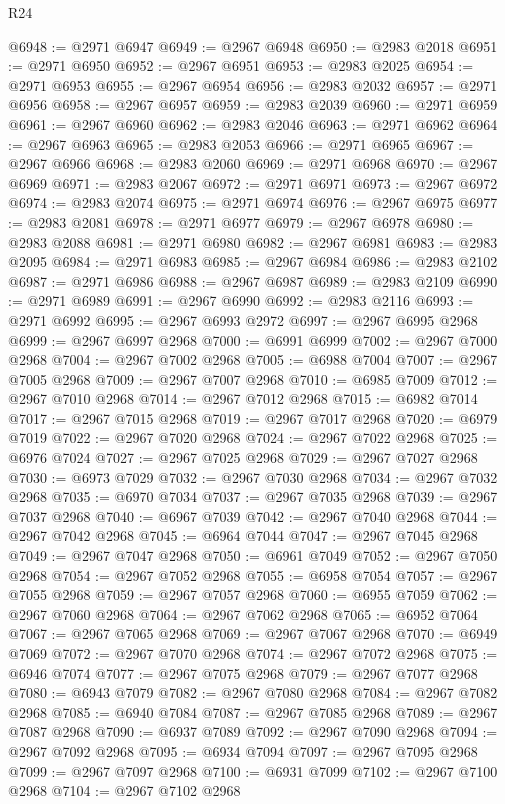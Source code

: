 \begin{lexlean}{R24}
\begin{coremodule}
@6948 := @2971 @6947
@6949 := @2967 @6948
@6950 := @2983 @2018
@6951 := @2971 @6950
@6952 := @2967 @6951
@6953 := @2983 @2025
@6954 := @2971 @6953
@6955 := @2967 @6954
@6956 := @2983 @2032
@6957 := @2971 @6956
@6958 := @2967 @6957
@6959 := @2983 @2039
@6960 := @2971 @6959
@6961 := @2967 @6960
@6962 := @2983 @2046
@6963 := @2971 @6962
@6964 := @2967 @6963
@6965 := @2983 @2053
@6966 := @2971 @6965
@6967 := @2967 @6966
@6968 := @2983 @2060
@6969 := @2971 @6968
@6970 := @2967 @6969
@6971 := @2983 @2067
@6972 := @2971 @6971
@6973 := @2967 @6972
@6974 := @2983 @2074
@6975 := @2971 @6974
@6976 := @2967 @6975
@6977 := @2983 @2081
@6978 := @2971 @6977
@6979 := @2967 @6978
@6980 := @2983 @2088
@6981 := @2971 @6980
@6982 := @2967 @6981
@6983 := @2983 @2095
@6984 := @2971 @6983
@6985 := @2967 @6984
@6986 := @2983 @2102
@6987 := @2971 @6986
@6988 := @2967 @6987
@6989 := @2983 @2109
@6990 := @2971 @6989
@6991 := @2967 @6990
@6992 := @2983 @2116
@6993 := @2971 @6992
@6995 := @2967 @6993 @2972
@6997 := @2967 @6995 @2968
@6999 := @2967 @6997 @2968
@7000 := @6991 @6999
@7002 := @2967 @7000 @2968
@7004 := @2967 @7002 @2968
@7005 := @6988 @7004
@7007 := @2967 @7005 @2968
@7009 := @2967 @7007 @2968
@7010 := @6985 @7009
@7012 := @2967 @7010 @2968
@7014 := @2967 @7012 @2968
@7015 := @6982 @7014
@7017 := @2967 @7015 @2968
@7019 := @2967 @7017 @2968
@7020 := @6979 @7019
@7022 := @2967 @7020 @2968
@7024 := @2967 @7022 @2968
@7025 := @6976 @7024
@7027 := @2967 @7025 @2968
@7029 := @2967 @7027 @2968
@7030 := @6973 @7029
@7032 := @2967 @7030 @2968
@7034 := @2967 @7032 @2968
@7035 := @6970 @7034
@7037 := @2967 @7035 @2968
@7039 := @2967 @7037 @2968
@7040 := @6967 @7039
@7042 := @2967 @7040 @2968
@7044 := @2967 @7042 @2968
@7045 := @6964 @7044
@7047 := @2967 @7045 @2968
@7049 := @2967 @7047 @2968
@7050 := @6961 @7049
@7052 := @2967 @7050 @2968
@7054 := @2967 @7052 @2968
@7055 := @6958 @7054
@7057 := @2967 @7055 @2968
@7059 := @2967 @7057 @2968
@7060 := @6955 @7059
@7062 := @2967 @7060 @2968
@7064 := @2967 @7062 @2968
@7065 := @6952 @7064
@7067 := @2967 @7065 @2968
@7069 := @2967 @7067 @2968
@7070 := @6949 @7069
@7072 := @2967 @7070 @2968
@7074 := @2967 @7072 @2968
@7075 := @6946 @7074
@7077 := @2967 @7075 @2968
@7079 := @2967 @7077 @2968
@7080 := @6943 @7079
@7082 := @2967 @7080 @2968
@7084 := @2967 @7082 @2968
@7085 := @6940 @7084
@7087 := @2967 @7085 @2968
@7089 := @2967 @7087 @2968
@7090 := @6937 @7089
@7092 := @2967 @7090 @2968
@7094 := @2967 @7092 @2968
@7095 := @6934 @7094
@7097 := @2967 @7095 @2968
@7099 := @2967 @7097 @2968
@7100 := @6931 @7099
@7102 := @2967 @7100 @2968
@7104 := @2967 @7102 @2968

\end{coremodule}
\end{lexlean}
